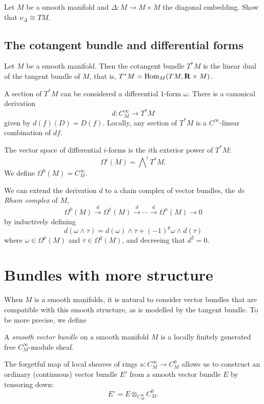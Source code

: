 \documentclass[a4paper,openany]{scrbook}
\begin{document}
\begin{exer}\label{exer:normalofdiagonal}
Let $M$ be a smooth manifold and $\Delta\colon M \to M \times M$ the diagonal embedding. Show that $\nu_{\Delta} \cong TM$.
\end{exer}

\subsection{The cotangent bundle and differential forms}

Let $M$ be a smooth manifold. Then the cotangent bundle $T^*M$ is the linear dual of the tangent bundle of $M$, that is, $T^*M = \operatorname{Hom}_M(TM,\mathbf R \times M)$.

A section of $T^*M$ can be considered a differential $1$-form $\omega$. There is a canonical derivation
\[
d\colon C^\infty_M \to T^*M 
\]
given by $d(f)(D) = D(f)$. Locally, any section of $T^*M$ is a $C^\infty$-linear combination of $df$.

The vector space of differential $i$-forms is the $i$th exterior power of $T^*M$:
\[
\Omega^i(M) = \bigwedge\nolimits^i T^*M.
\]
We define $\Omega^0(M) = C^\infty_M$.

We can extend the derivation $d$ to a chain complex of vector bundles, the \emph{de Rham complex} of $M$,
\[
\Omega^0(M) \xrightarrow{d} \Omega^1(M) \xrightarrow{d} \cdots \xrightarrow{d} \Omega^n(M) \to 0
\]
by inductively defining
\[
d(\omega \wedge \tau) = d(\omega) \wedge \tau + (-1)^{p} \omega \wedge d(\tau)
\]
where $\omega \in \Omega^p(M)$ and $\tau \in \Omega^q(M)$, and decreeing that $d^2=0$.



\section{Bundles with more structure}

When $M$ is a smooth manifolds, it is natural to consider vector bundles that are compatible with this smooth structure, as is modelled by the tangent bundle. To be more precise, we define

\begin{defn}
A \emph{smooth vector bundle} on a smooth manifold $M$ is a locally finitely generated free $C^\infty_M$-module sheaf.
\end{defn}

The forgetful map of local sheaves of rings $u\colon C^\infty_M \to C^0_M$ allows us to construct an ordinary (continuous) vector bundle $E'$ from a smooth vector bundle $E$ by tensoring down:
\[
E' = E \otimes_{C^\infty_M} C^0_M.
\]
\end{document}
